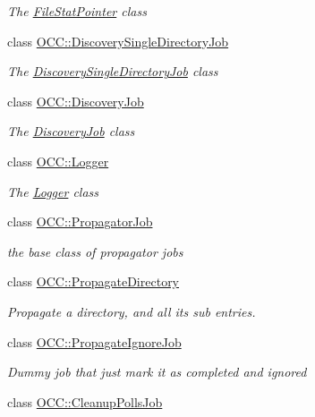 \begin{DoxyCompactItemize}
\begin{DoxyCompactList}\small\item\em The \hyperlink{class_o_c_c_1_1_file_stat_pointer}{File\+Stat\+Pointer} class \end{DoxyCompactList}\item 
class \hyperlink{class_o_c_c_1_1_discovery_single_directory_job}{O\+C\+C\+::\+Discovery\+Single\+Directory\+Job}
\begin{DoxyCompactList}\small\item\em The \hyperlink{class_o_c_c_1_1_discovery_single_directory_job}{Discovery\+Single\+Directory\+Job} class \end{DoxyCompactList}\item 
class \hyperlink{class_o_c_c_1_1_discovery_job}{O\+C\+C\+::\+Discovery\+Job}
\begin{DoxyCompactList}\small\item\em The \hyperlink{class_o_c_c_1_1_discovery_job}{Discovery\+Job} class \end{DoxyCompactList}\item 
class \hyperlink{class_o_c_c_1_1_logger}{O\+C\+C\+::\+Logger}
\begin{DoxyCompactList}\small\item\em The \hyperlink{class_o_c_c_1_1_logger}{Logger} class \end{DoxyCompactList}\item 
class \hyperlink{class_o_c_c_1_1_propagator_job}{O\+C\+C\+::\+Propagator\+Job}
\begin{DoxyCompactList}\small\item\em the base class of propagator jobs \end{DoxyCompactList}\item 
class \hyperlink{class_o_c_c_1_1_propagate_directory}{O\+C\+C\+::\+Propagate\+Directory}
\begin{DoxyCompactList}\small\item\em Propagate a directory, and all its sub entries. \end{DoxyCompactList}\item 
class \hyperlink{class_o_c_c_1_1_propagate_ignore_job}{O\+C\+C\+::\+Propagate\+Ignore\+Job}
\begin{DoxyCompactList}\small\item\em Dummy job that just mark it as completed and ignored \end{DoxyCompactList}\item 
class \hyperlink{class_o_c_c_1_1_cleanup_polls_job}{O\+C\+C\+::\+Cleanup\+Polls\+Job}

\end{DoxyCompactItemize}
